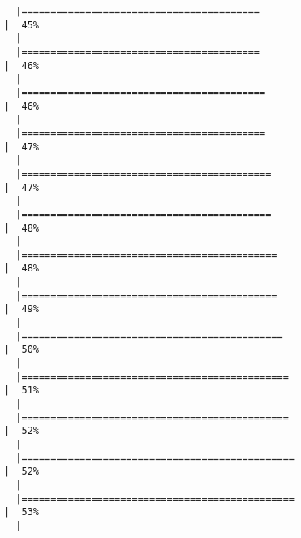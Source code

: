 \documentclass[12pt]{article}
\begin{document}
\begin{verbatim}
  |=========================================                                                 |  45%
  |                                                                                                
  |=========================================                                                 |  46%
  |                                                                                                
  |==========================================                                                |  46%
  |                                                                                                
  |==========================================                                                |  47%
  |                                                                                                
  |===========================================                                               |  47%
  |                                                                                                
  |===========================================                                               |  48%
  |                                                                                                
  |============================================                                              |  48%
  |                                                                                                
  |============================================                                              |  49%
  |                                                                                                
  |=============================================                                             |  50%
  |                                                                                                
  |==============================================                                            |  51%
  |                                                                                                
  |==============================================                                            |  52%
  |                                                                                                
  |===============================================                                           |  52%
  |                                                                                                
  |===============================================                                           |  53%
  |                                                                                                

\end{verbatim}
\end{document}
